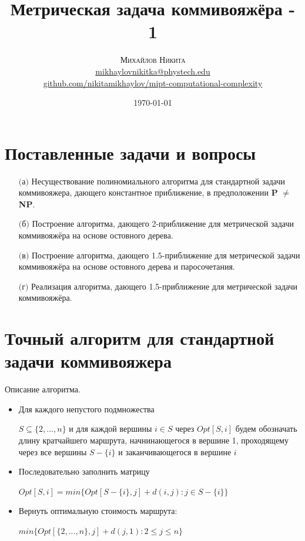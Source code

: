 \documentclass[A4, twocolumn]{article}
\title{
\textbf{Метрическая задача коммивояжёра - 1} 
}
\date{\today}
\author{ 
	\textsc{Михайлов Никита} \\
	\normalsize \href{mailto:mikhaylovnikitka@phystech.edu}{mikhaylovnikitka@phystech.edu} \\
	\normalsize \href{https://github.com/nikitamikhaylov/mipt-computational-complexity}{github.com/nikitamikhaylov/mipt-computational-complexity}
}
\begin{document}
    \maketitle
    
	
	\section{\textbf{Поставленные задачи и вопросы}}
	
		\begin{enumerate}
			\item[$($а$)$] Несуществование полиномиального алгоритма для стандартной задачи коммивояжера, дающего константное приближение, в предположении \textbf{P} $\ne$ \textbf{NP}.
			\item[$($б$)$] Построение алгоритма, дающего 2-приближение для метрической задачи коммивояжёра на основе остовного дерева.
			\item[$($в$)$] Построение алгоритма, дающего 1.5-приближение для метрической задачи коммивояжёра на основе остовного дерева и паросочетания. 
			\item[$($г$)$] Реализация алгоритма, дающего 1.5-приближение для метрической задачи коммивояжёра.
		\end{enumerate}
	
	\section{\textbf{Точный алгоритм для стандартной задачи коммивояжера}}	
	Описание алгоритма.
	\begin{itemize}
		\item Для каждого непустого подмножества 
		
		$S \subseteq \{2, . . . , n\}$ и для каждой вершины $i \in S$ через $Opt[S,i]$ будем обозначать длину кратчайшего маршрута, начнинающегося в вершине 1, проходящему через все вершины $S − \{i\}$ и заканчивающегося в вершине $i$
		\item Последовательно заполнить матрицу 
		
		$Opt [S , i ] = min\{Opt [S − \{i \}, j ] + d (i , j ) : j ∈ S − \{i \}\}$
		\item Вернуть оптимальную стоимость маршрута: 
		
		$min\{Opt[\{2,...,n\},j]+d(j,1):2 \leq j \leq n\}$
	\end{itemize}		
\end{document}
